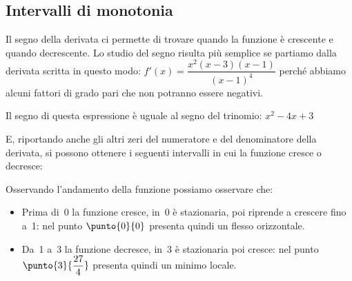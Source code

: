 \subsection{Intervalli di monotonia}
Il segno della derivata ci permette di trovare quando la funzione è crescente 
e quando decrescente. Lo studio del segno risulta più semplice se partiamo 
dalla derivata scritta in questo modo:
\(f'(x) = \dfrac{x^2(x-3)(x-1)}{(x-1)^4}\)
perché abbiamo alcuni fattori di grado pari che non potranno essere negativi.

\begin{minipage}{.49\linewidth}
Il segno di questa espressione è uguale al segno del trinomio:
\(x^2-4x+3\)
\end{minipage}
\hfill
\begin{minipage}{.49\linewidth}
 \begin{center}
\segnotrinomioa
 \end{center}
\end{minipage}

E, riportando anche gli altri zeri del numeratore e del denominatore della 
derivata, si possono ottenere i seguenti intervalli in cui la funzione cresce 
o decresce:
\begin{center}
 \segnoderivataa
\end{center}

Osservando l'andamento della funzione possiamo osservare che:
\begin{itemize} [nosep]
 \item Prima di~0 la funzione cresce, in~0 è stazionaria, poi riprende a 
crescere fino a~1: nel punto \(\punto{0}{0}\) presenta quindi un flesso 
orizzontale.
 \item Da~1 a~3 la funzione decresce, in~3 è stazionaria poi cresce: nel 
punto \(\punto{3}{\dfrac{27}{4}}\) presenta quindi un minimo locale.
\end{itemize}

\begin{comment}

\begin{minipage}{.60\linewidth}
\end{minipage}
\hfill
\begin{minipage}{.38\linewidth}
 \begin{center}
\segnofunzionea
 \end{center}
\end{minipage}

\end{comment}

